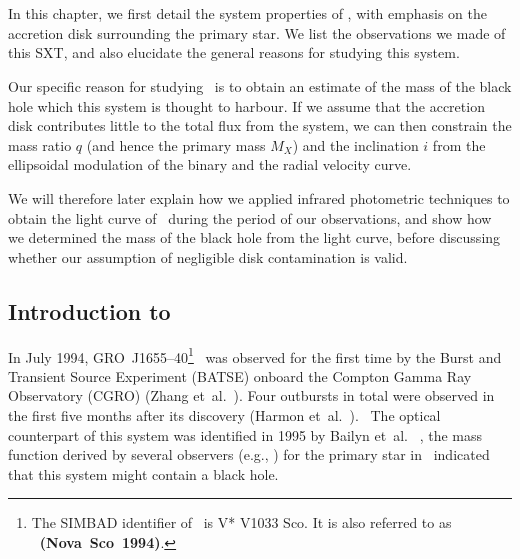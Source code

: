 \chapter{\groj}\label{cha:GROJ1655-40}

In this chapter, we first detail the system properties of \groj, with
emphasis on the accretion disk surrounding the primary star. We list
the observations we made of this SXT, and also elucidate the general reasons for studying this
system. %

\vspace{\myparskip}

Our specific reason for studying \groj\ is to obtain an estimate of
the mass of the black hole which this system is thought to harbour. If
we assume that the accretion disk contributes little to the total flux
from the system, we can then constrain the mass ratio $q$ (and hence the primary mass $M_{X}$) and the inclination $i$  from the ellipsoidal modulation of the binary and the radial velocity curve. %

\vspace{\myparskip}

We will therefore later explain how we applied infrared photometric techniques to obtain the light curve of \groj\ during the period of our observations, and show how we determined the mass of the black hole from the light curve, before discussing whether our assumption of negligible disk
contamination is valid.


\section{Introduction to \groj}\label{cha:GROJ1655-40:sec:IntroductionToJ1655}

In July 1994, \mbox{GRO J1655--40}\footnote{\label{cha:GROJ1655-40:sec:IntroductionToJ1655:foot:SIMBAD}
The SIMBAD identifier of \groj\ is V* V1033 Sco. It is also
referred to as \textbf{\nova\ (\mbox{Nova Sco 1994})}.%
}%
\ was observed for the first time by the Burst and
Transient Source Experiment (BATSE) onboard the Compton Gamma Ray
Observatory (CGRO) (Zhang et~al.\ ). %
Four outbursts in total were observed in the first five months after
its discovery (Harmon et~al.\ ).%
\ The optical counterpart of this system was identified in 1995 by
Bailyn et~al.\ \citeyear{BailynOroszGirad_et_al.:1995}%
, the mass function derived by several observers (e.g.,
) for the primary star in \groj\ indicated
that this system might contain a black hole. %

